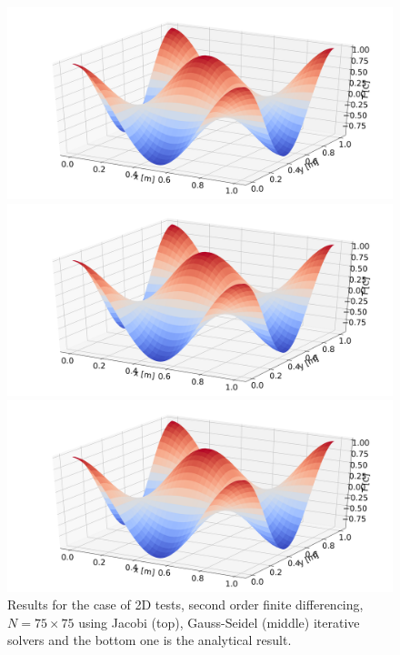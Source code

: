 \documentclass[12pt]{amsart}   %
\begin{document}
\begin{figure}[htbp!] 
\begin{minipage}[htbp!]{\linewidth}
  \centering
    \includegraphics[width=\linewidth,keepaspectratio, trim = 0cm 0cm 0cm 0cm,clip]{Project1photos/plot_Jacobi_2D_order2_n75.png}
\end{minipage}
\begin{minipage}[htbp!]{\linewidth}
  \centering
    \includegraphics[width=\linewidth,keepaspectratio]{Project1photos/plot_GS_2D_order2_n75.png}
\end{minipage}
\begin{minipage}[htbp!]{\linewidth}
  \centering
    \includegraphics[width=\linewidth,keepaspectratio]{Project1photos/plot_Jacobi_2D_order2_n75_Analytical.png}
\end{minipage}
\caption{Results for the case of 2D tests, second order finite differencing, $N=75 \times 75$ using Jacobi (top), Gauss-Seidel (middle) iterative solvers and the bottom one is the analytical result.} \label{fig:plot2D}
\end{figure}
\end{document}
